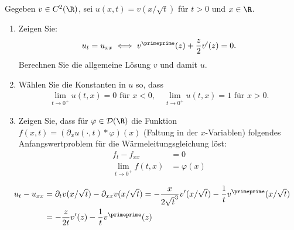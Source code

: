
\begin{exercise}

Gegeben $v \in C^2(\R)$, sei $u(x,t) = v\left(x/\sqrt{t}\right)$ für $t > 0$ und $x \in \R$.
\begin{enumerate}[label = (\roman*)]
  \item Zeigen Sie:
  \begin{align*}
    u_t = u_{xx} \iff v^{\primeprime}(z) + \frac{z}{2}v^{\prime}(z) = 0.
  \end{align*}
  Berechnen Sie die allgemeine Lösung $v$ und damit $u$.
  \item Wählen Sie die Konstanten in $u$ so, dass
  \begin{align*}
    \lim_{t \to 0^+} u(t,x) = 0 \text{ für } x < 0, \quad \lim_{t \to 0^+} u(t,x) = 1
    \text{ für } x > 0.
  \end{align*}
  \item Zeigen Sie, dass für $\varphi \in \mathcal{D}(\R)$ die Funktion
  $f(x,t) = (\partial_x u(\cdot,t)\ast \varphi)(x)$ (Faltung in der $x$-Variablen)
  folgendes Anfangswertproblem für die Wärmeleitungsgleichung löst:
  \begin{align*}
    f_t - f_{xx} &= 0 \\
    \lim_{t \to 0^+} f(t,x) &= \varphi(x)
  \end{align*}
\end{enumerate}
\end{exercise}


\begin{solution}

\begin{align*}
  u_t - u_{xx} &= \partial_t v(x/\sqrt{t}) - \partial_{xx}v(x/\sqrt{t})
  = -\frac{x}{2\sqrt{t}^3}v^{\prime}(x/\sqrt{t}) - \frac{1}{t}v^{\primeprime}(x/\sqrt{t}) \\
  &= - \frac{z}{2t}v^{\prime}(z) - \frac{1}{t}v^{\primeprime}(z)
\end{align*}

\end{solution}

